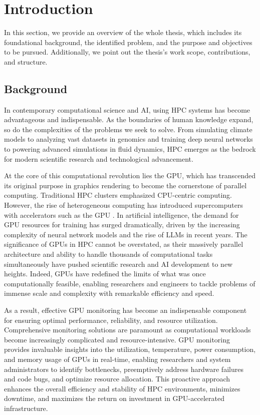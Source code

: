 \chapter{Introduction}
In this section, we provide an overview of the whole thesis, which includes its foundational background, the identified problem, and the purpose and objectives to be pursued. Additionally, we point out the thesis's work scope, contributions, and structure.

\section{Background}
In contemporary computational science and AI, using HPC systems has become advantageous and indispensable. As the boundaries of human knowledge expand, so do the complexities of the problems we seek to solve. From simulating climate models to analyzing vast datasets in genomics and training deep neural networks to powering advanced simulations in fluid dynamics, HPC emerges as the bedrock for modern scientific research and technological advancement.

At the core of this computational revolution lies the GPU, which has transcended its original purpose in graphics rendering to become the cornerstone of parallel computing. Traditional HPC clusters emphasized CPU-centric computing. However, the rise of heterogeneous computing has introduced supercomputers with accelerators such as the GPU \cite{5289128}. In artificial intelligence, the demand for GPU resources for training has surged dramatically, driven by the increasing complexity of neural network models and the rise of LLMs in recent years. The significance of GPUs in HPC cannot be overstated, as their massively parallel architecture and ability to handle thousands of computational tasks simultaneously have pushed scientific research and AI development to new heights. Indeed, GPUs have redefined the limits of what was once computationally feasible, enabling researchers and engineers to tackle problems of immense scale and complexity with remarkable efficiency and speed.

As a result, effective GPU monitoring has become an indispensable component for ensuring optimal performance, reliability, and resource utilization. Comprehensive monitoring solutions are paramount as computational workloads become increasingly complicated and resource-intensive. GPU monitoring provides invaluable insights into the utilization, temperature, power consumption, and memory usage of GPUs in real-time, enabling researchers and system administrators to identify bottlenecks, preemptively address hardware failures and code bugs, and optimize resource allocation. This proactive approach enhances the overall efficiency and stability of HPC environments, minimizes downtime, and maximizes the return on investment in GPU-accelerated infrastructure.

